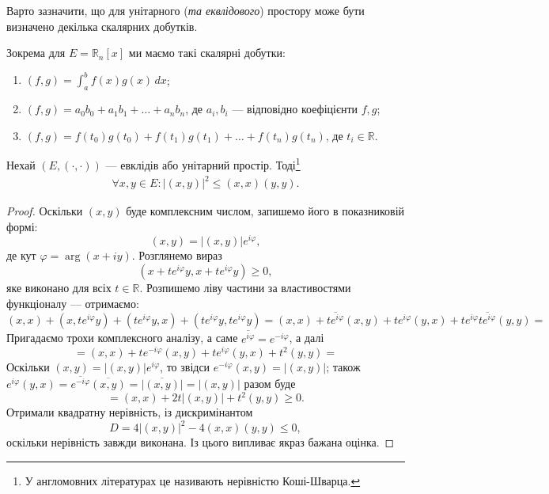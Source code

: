 \documentclass{math_library}
\begin{document}
\begin{remark}
Варто зазначити, що для унітарного (\textit{та еквлідового}) простору може бути визначено декілька скалярних добутків.
\end{remark}

\begin{example}
Зокрема для $E = \mathbb{R}_n[x]$ ми маємо такі скалярні добутки:
\begin{enumerate}[nosep,wide=0pt,label={\arabic*)}]
\item $(f,g) = \displaystyle\int_a^b f(x)g(x)\,dx$;
\item $(f,g) = a_0 b_0 + a_1 b_1 + \dots + a_n b_n$, де $a_i,b_i$ --- відповідно коефіцієнти $f,g$;
\item $(f,g) = f(t_0)g(t_0) + f(t_1)g(t_1) + \dots + f(t_n)g(t_n)$, де $t_i \in \mathbb{R}$.
\end{enumerate}
\end{example}

\begin{theorem}
Нехай $(E, (\cdot , \cdot))$ --- евклідів або унітарний простір. Тоді\footnote{У англомовних літературах це називають нерівністю Коші-Шварца.}
\begin{align*}
 \forall x,y \in E: |(x,y)|^2 \leq (x,x)(y,y).
 \end{align*}
\end{theorem}

\begin{proof}

Оскільки $(x,y)$ буде комплексним числом, запишемо його в показниковій формі:
\[
(x,y) = |(x,y)|e^{i \varphi},
\]
де кут $\varphi = \arg (x+iy)$. Розглянемо вираз
\[
(x+te^{i\varphi}y,x + t e^{i\varphi}y) \geq 0,
\]
яке виконано для всіх $t \in \mathbb{R}$. Розпишемо ліву частини за властивостями функціоналу --- отримаємо:
\[
(x,x)+(x,te^{i\varphi}y) + (te^{i\varphi}y,x)+(te^{i\varphi}y, te^{i\varphi}y)
= (x,x) + \overline{t e^{i\varphi}}(x,y) + te^{i \varphi} (y,x) + te^{i \varphi} \overline{t e^{i\varphi}} (y,y) \boxed{=}
\]
Пригадаємо трохи комплексного аналізу, а саме $\overline{e^{i\varphi}} = e^{-i\varphi}$, а далі
\[
\boxed{=} (x,x) + te^{-i\varphi}(x,y) + te^{i\varphi}(y,x) + t^2(y,y) \boxed{=}
\]
Оскільки $(x,y) = |(x,y)|e^{i \varphi}$, то звідси $e^{-i \varphi}(x,y) = |(x,y)|$; також $e^{i\varphi}(y,x) = \overline{e^{-i\varphi}} \overline{(x,y)} = \overline{|(x,y)|} = |(x,y)|$ разом буде
\[
\boxed{=} (x,x) + 2t|(x,y)| + t^2(y,y) \geq 0.
\]
Отримали квадратну нерівність, із дискримінантом
\[
D = 4|(x,y)|^2 - 4(x,x)(y,y) \leq 0,
\]
оскільки нерівність завжди виконана. Із цього випливає якраз бажана оцінка.
\end{proof}
\end{document}
